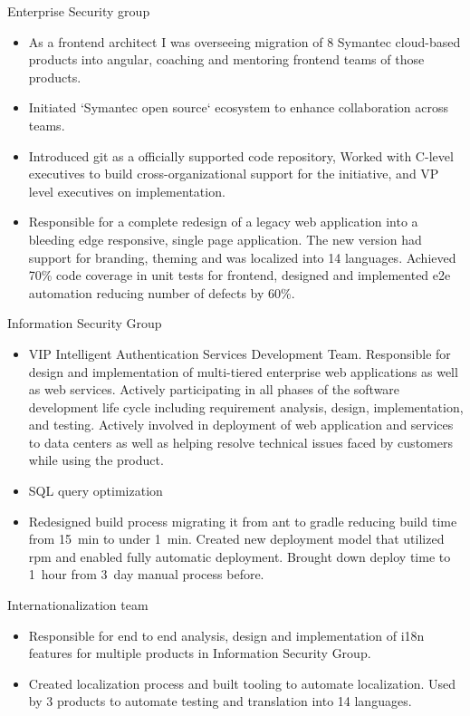 \documentclass[11pt,a4paper,roman]{moderncv}       %
\begin{document}
Enterprise Security group
\begin{itemize}
    \item As a frontend architect I was overseeing migration of 8 Symantec cloud-based products into angular, coaching and mentoring frontend teams of those products. 
    \item Initiated `Symantec open source` ecosystem to enhance collaboration across teams. 
    \item Introduced git as a officially supported code repository, Worked with C-level executives to build cross-organizational support for the initiative, and VP level executives on implementation.
    \item Responsible for a complete redesign of a legacy web application into a bleeding edge responsive, single page application. The new version had support for branding, theming and was localized into 14 languages. Achieved 70\% code coverage in unit tests for frontend, designed and implemented e2e automation reducing number of defects by 60\%.
\end{itemize}

\vspace{6pt}

Information Security Group

\begin{itemize}
    \item VIP Intelligent Authentication Services Development Team. Responsible for design and implementation of multi-tiered enterprise web applications as well as web services. Actively participating in all phases of the software development life cycle including requirement analysis, design, implementation, and testing. Actively involved in deployment of web application and services to data centers as well as helping resolve technical issues faced by customers while using the product.
    \item SQL query optimization
    \item Redesigned build process migrating it from ant to gradle reducing build time from 15~min to under 1~min. Created new deployment model that utilized rpm and enabled fully automatic deployment. Brought down deploy time to 1~hour from 3~day manual process before.
\end{itemize}

\vspace{6pt}

Internationalization team

\begin{itemize}
    \item Responsible for end to end analysis, design and implementation of i18n features for multiple products in Information Security Group.
    \item Created localization process and built tooling to automate localization. Used by 3 products to automate testing and translation into 14 languages.
\end{itemize}
\end{document}
